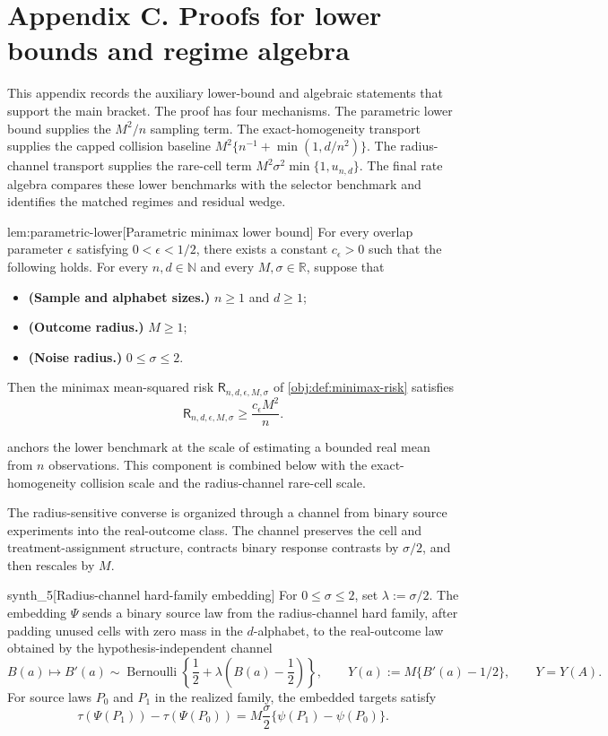 \section{Appendix C. Proofs for lower bounds and regime algebra}

This appendix records the auxiliary lower-bound and algebraic statements that support the main bracket. The proof has four mechanisms. The parametric lower bound supplies the \(M^2/n\) sampling term. The exact-homogeneity transport supplies the capped collision baseline \(M^2\{n^{-1}+\min(1,d/n^2)\}\). The radius-channel transport supplies the rare-cell term \(M^2\sigma^2\min\{1,u_{n,d}\}\). The final rate algebra compares these lower benchmarks with the selector benchmark and identifies the matched regimes and residual wedge.

\begin{lemmav}{lem:parametric-lower}[Parametric minimax lower bound]
For every overlap parameter \(\epsilon\) satisfying \(0<\epsilon<1/2\), there exists a constant \(c_{\epsilon}>0\) such that the following holds. For every \(n,d\in\mathbb N\) and every \(M,\sigma\in\mathbb R\), suppose that
\begin{itemize}
\item \textbf{(Sample and alphabet sizes.)} \(n\ge 1\) and \(d\ge 1\);
\item \textbf{(Outcome radius.)} \(M\ge 1\);
\item \textbf{(Noise radius.)} \(0\le \sigma\le 2\).
\end{itemize}
Then the minimax mean-squared risk \(\mathsf R_{n,d,\epsilon,M,\sigma}\) of \cref{obj:def:minimax-risk} satisfies
\[
\mathsf R_{n,d,\epsilon,M,\sigma}\ge \frac{c_{\epsilon}M^2}{n}.
\]
\end{lemmav}

 anchors the lower benchmark at the scale of estimating a bounded real mean from \(n\) observations. This component is combined below with the exact-homogeneity collision scale and the radius-channel rare-cell scale.

The radius-sensitive converse is organized through a channel from binary source experiments into the real-outcome class. The channel preserves the cell and treatment-assignment structure, contracts binary response contrasts by \(\sigma/2\), and then rescales by \(M\).

\begin{definitionv}{synth_5}[Radius-channel hard-family embedding]
For \(0\le\sigma\le2\), set \(\lambda:=\sigma/2\). The embedding \(\Psi\) sends a binary source law from the radius-channel hard family, after padding unused cells with zero mass in the \(d\)-alphabet, to the real-outcome law obtained by the hypothesis-independent channel
\[
B(a)\longmapsto B'(a)\sim\operatorname{Bernoulli}\!\left\{\frac12+\lambda\left(B(a)-\frac12\right)\right\},
\qquad
Y(a):=M\{B'(a)-1/2\},
\qquad
Y=Y(A).
\]
For source laws \(P_0\) and \(P_1\) in the realized family, the embedded targets satisfy
\[
\tau(\Psi(P_1))-\tau(\Psi(P_0))
=
M\frac{\sigma}{2}\{\psi(P_1)-\psi(P_0)\}.
\]
\end{definitionv}

